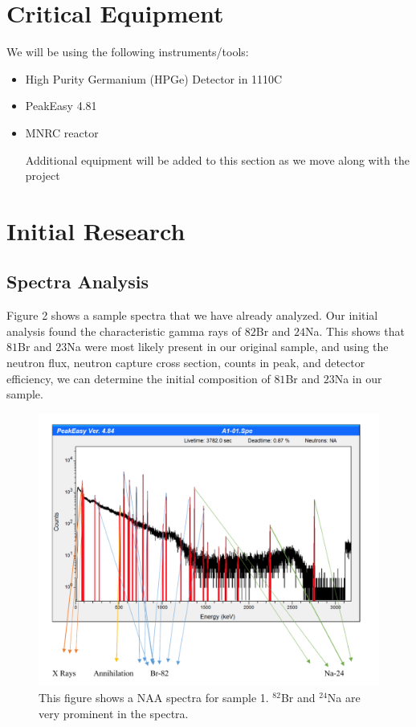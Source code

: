 \documentclass[]{article}
\begin{document}
\pagebreak

\section{Critical Equipment}
We will be using the following instruments/tools:


\begin{itemize}
\item High Purity Germanium (HPGe) Detector in 1110C
\item PeakEasy 4.81
\item MNRC reactor

Additional equipment will be added to this section as we move along with the project

\end{itemize}


\section{Initial Research}
\subsection{Spectra Analysis}

Figure 2 shows a sample spectra that we have already analyzed. Our initial analysis found the characteristic gamma rays of ${82}$Br and ${24}$Na. This shows that ${81}$Br and ${23}$Na were most likely present in our original sample, and using the neutron flux, neutron capture cross section, counts in peak, and detector efficiency, we can determine the initial composition of ${81}$Br and ${23}$Na in our sample.

\begin{figure}[h]
\centering
\includegraphics[scale=0.5]{ExampleSpectra}
\caption{This figure shows a NAA spectra for sample 1. $^{82}$Br and $^{24}$Na are very prominent in the spectra.}
\end{figure} 
\end{document}
